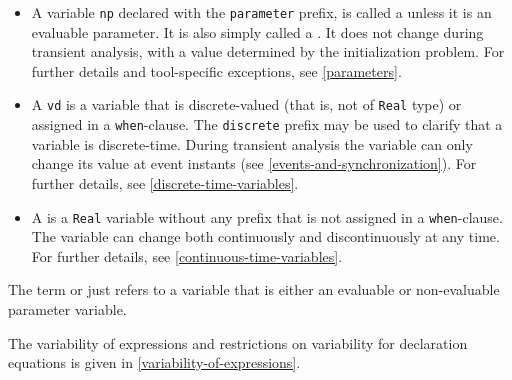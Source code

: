 \begin{itemize}
  For further details, see \ref{parameters}.
\item
  A variable \lstinline!np! declared with the \lstinline!parameter! prefix, is called a  unless it is an evaluable parameter.
  It is also simply called a .
  It does not change during transient analysis, with a value determined by the initialization problem.
  For further details and tool-specific exceptions, see \ref{parameters}.
\item
  A  \lstinline!vd! is a variable that is discrete-valued (that is, not of \lstinline!Real! type) or assigned in a \lstinline!when!-clause.
  The \lstinline!discrete! prefix may be used to clarify that a variable is discrete-time.
  During transient analysis the variable can only change its value at event instants (see \cref{events-and-synchronization}).
  For further details, see \ref{discrete-time-variables}.
\item
  A  is a \lstinline!Real! variable without any prefix that is not assigned in a \lstinline!when!-clause.
  The variable can change both continuously and discontinuously at any time.
  For further details, see \ref{continuous-time-variables}.
\end{itemize}

The term  or just  refers to a variable that is either an evaluable or non-evaluable parameter variable.

The variability of expressions and restrictions on variability for declaration equations is given in \cref{variability-of-expressions}.

